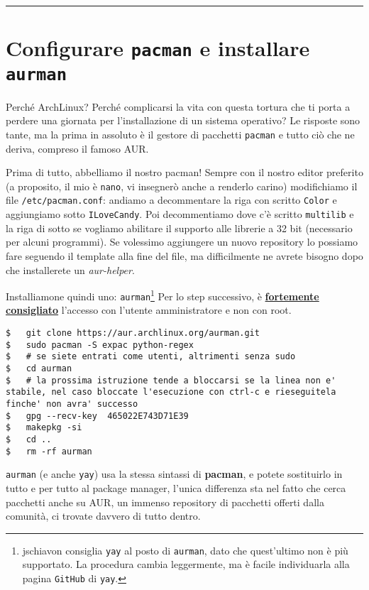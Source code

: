 \documentclass[twoside,italian]{book}
\newcommand{\code}[1]{\texttt{#1}}
\newcommand{\nlinea}{
	\leavevmode
	\\
}
\newcommand{\arch}{ArchLinux}
\begin{document}
    \nlinea

    \nlinea

    \hrule


\section{Configurare \code{pacman} e installare \code{aurman}}

    Perché \arch? Perché complicarsi la vita con questa tortura che ti porta a perdere una giornata per l'installazione di un sistema operativo? Le risposte sono tante, ma la prima in assoluto è il gestore di pacchetti \code{pacman} e tutto ciò che ne deriva, compreso il famoso \ac{AUR}.

    Prima di tutto, abbelliamo il nostro pacman!
    Sempre con il nostro editor preferito (a proposito, il mio è \code{nano}, vi insegnerò anche a renderlo carino) modifichiamo il file \code{/etc/pacman.conf}: andiamo a decommentare la riga con scritto \code{Color} e aggiungiamo sotto \code{ILoveCandy}.
    Poi decommentiamo dove c'è scritto \code{multilib} e la riga di sotto se vogliamo abilitare il supporto alle librerie a 32 bit (necessario per alcuni programmi).
    Se volessimo aggiungere un nuovo repository lo possiamo fare seguendo il template alla fine del file, ma difficilmente ne avrete bisogno dopo che installerete un \textit{aur-helper}.

    Installiamone quindi uno: \code{aurman}\footnote{jschiavon consiglia \code{yay} al posto di \code{aurman}, dato che quest'ultimo non è più supportato. La procedura cambia leggermente, ma è facile individuarla alla pagina \code{GitHub} di \code{yay}.}
    Per lo step successivo, è \underline{\textbf{fortemente consigliato}} l'accesso con l'utente amministratore e non con root.

\begin{lstlisting}
$   git clone https://aur.archlinux.org/aurman.git
$   sudo pacman -S expac python-regex
$   # se siete entrati come utenti, altrimenti senza sudo
$   cd aurman
$   # la prossima istruzione tende a bloccarsi se la linea non e' stabile, nel caso bloccate l'esecuzione con ctrl-c e rieseguitela finche' non avra' successo
$   gpg --recv-key  465022E743D71E39
$   makepkg -si
$   cd ..
$   rm -rf aurman
\end{lstlisting}

    \code{aurman} (e anche \code{yay}) usa la stessa sintassi di \textbf{pacman}, e potete sostituirlo in tutto e per tutto al package manager, l'unica differenza sta nel fatto che cerca pacchetti anche su \ac{AUR}, un immenso repository di pacchetti offerti dalla comunità, ci trovate davvero di tutto dentro. 
    
\end{document}
